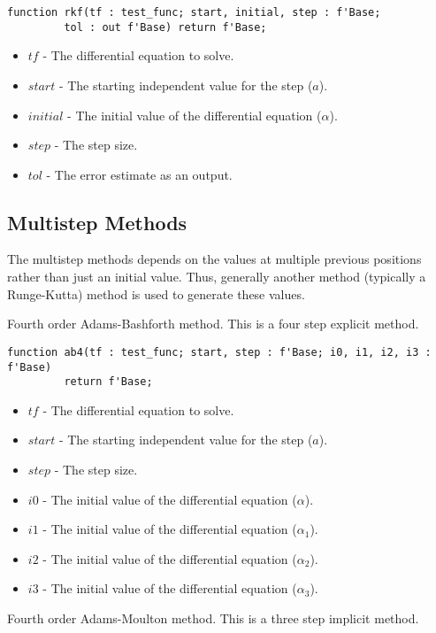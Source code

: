 \documentclass[10pt, openany]{book}
\begin{document}
\begin{lstlisting}
function rkf(tf : test_func; start, initial, step : f'Base;
         tol : out f'Base) return f'Base;
\end{lstlisting}
\begin{itemize}
  \item $tf$ - The differential equation to solve.
  \item $start$ - The starting independent value for the step ($a$).
  \item $initial$ - The initial value of the differential equation ($\alpha$).
  \item $step$ - The step size.
  \item $tol$ - The error estimate as an output.
\end{itemize}

\subsection{Multistep Methods}
The multistep methods depends on the values at multiple previous positions rather than just an initial value.  Thus, generally another method (typically a Runge-Kutta) method is used to generate these values.

Fourth order Adams-Bashforth method.  This is a four step explicit method.

\begin{lstlisting}
function ab4(tf : test_func; start, step : f'Base; i0, i1, i2, i3 : f'Base)
         return f'Base;
\end{lstlisting}
\begin{itemize}
  \item $tf$ - The differential equation to solve.
  \item $start$ - The starting independent value for the step ($a$).
  \item $step$ - The step size.
  \item $i0$ - The initial value of the differential equation ($\alpha$).
  \item $i1$ - The initial value of the differential equation ($\alpha_1$).
  \item $i2$ - The initial value of the differential equation ($\alpha_2$).
  \item $i3$ - The initial value of the differential equation ($\alpha_3$).
\end{itemize}

Fourth order Adams-Moulton method.  This is a three step implicit method.
\end{document}
